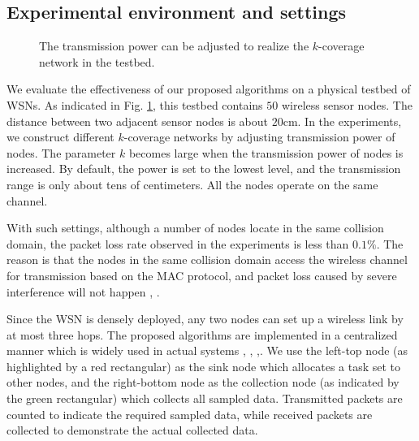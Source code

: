 \documentclass[prodmode,acmtosn]{acmsmall}
\begin{document}
\subsection{Experimental environment and settings}
\begin{figure}[t]
\centering
{}
\caption{The transmission power can be adjusted to realize the $k$-coverage network  in the testbed.}
\label{figure_testbed}
\end{figure}



We evaluate the effectiveness of our proposed algorithms on a physical testbed of WSNs. As indicated in Fig. \ref{figure_testbed}, this testbed contains $50$ wireless sensor nodes. The distance between two adjacent sensor nodes is about $20$cm. In the experiments, we construct different $k$-coverage networks by adjusting transmission power of nodes. The parameter $k$ becomes large when the transmission power of nodes is increased. By default, the power is set to the lowest level, and the transmission range is only about tens of centimeters. All the nodes operate on the same channel.

With such settings, although a number of nodes locate in the same collision domain, the packet loss rate observed in the experiments is less than $0.1\%$. The reason is that the nodes in the same collision domain access the wireless channel for transmission based on the MAC protocol, and packet loss caused by severe interference will not happen \cite{2006_MAC_survey}, \cite{1994MACAW}.

Since the WSN is densely deployed, any two nodes can set up a wireless link by at most three hops. The proposed algorithms are implemented in a centralized manner which is widely used in actual systems \cite{2009greenorbs}, \cite{2009_oceansense}, \cite{2007_outlier_detection_mobihoc},\cite{2011_compressed_data_aggregation}. We use the left-top node (as highlighted by a red rectangular) as the sink node which allocates a task set to other nodes, and the right-bottom node as the collection node (as indicated by the green rectangular) which collects all sampled data. Transmitted packets are counted to indicate the required sampled data, while received packets are collected to demonstrate the actual collected data.
\end{document}
